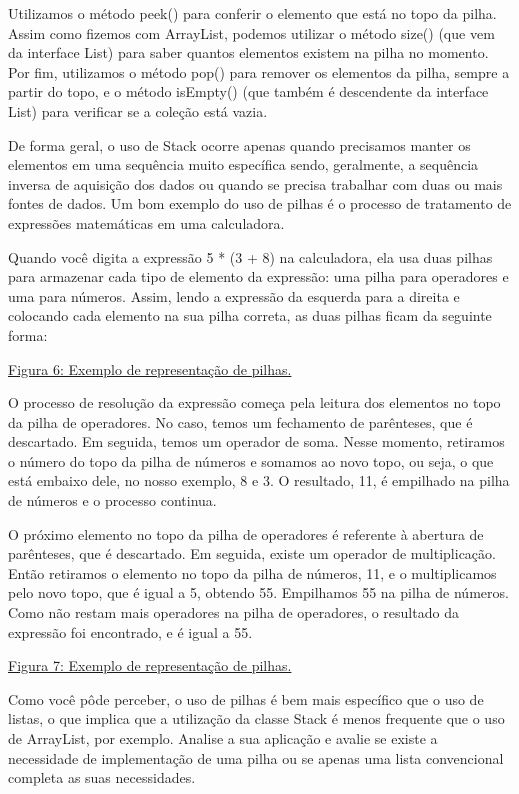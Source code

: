 \documentclass[11pt]{article}
\begin{document}
Utilizamos o método peek() para conferir o elemento que está no topo da pilha. Assim como fizemos com ArrayList, podemos utilizar o método size() (que vem da interface List) para saber quantos elementos existem na pilha no momento. Por fim, utilizamos o método pop() para remover os elementos da pilha, sempre a partir do topo, e o método isEmpty() (que também é descendente da interface List) para verificar se a coleção está vazia.

De forma geral, o uso de Stack ocorre apenas quando precisamos manter os elementos em uma sequência muito específica sendo, geralmente, a sequência inversa de aquisição dos dados ou quando se precisa trabalhar com duas ou mais fontes de dados. Um bom exemplo do uso de pilhas é o processo de tratamento de expressões matemáticas em uma calculadora.

Quando você digita a expressão 5 * (3 + 8) na calculadora, ela usa duas pilhas para armazenar cada tipo de elemento da expressão: uma pilha para operadores e uma para números. Assim, lendo a expressão da esquerda para a direita e colocando cada elemento na sua pilha correta, as duas pilhas ficam da seguinte forma:

\href{figura6.png}{Figura 6: Exemplo de representação de pilhas.}

O processo de resolução da expressão começa pela leitura dos elementos no topo da pilha de operadores. No caso, temos um fechamento de parênteses, que é descartado. Em seguida, temos um operador de soma. Nesse momento, retiramos o número do topo da pilha de números e somamos ao novo topo, ou seja, o que está embaixo dele, no nosso exemplo, 8 e 3. O resultado, 11, é empilhado na pilha de números e o processo continua.

O próximo elemento no topo da pilha de operadores é referente à abertura de parênteses, que é descartado. Em seguida, existe um operador de multiplicação. Então retiramos o elemento no topo da pilha de números, 11, e o multiplicamos pelo novo topo, que é igual a 5, obtendo 55. Empilhamos 55 na pilha de números. Como não restam mais operadores na pilha de operadores, o resultado da expressão foi encontrado, e é igual a 55.

\href{figura7.png}{Figura 7: Exemplo de representação de pilhas.}

Como você pôde perceber, o uso de pilhas é bem mais específico que o uso de listas, o que implica que a utilização da classe Stack é menos frequente que o uso de ArrayList, por exemplo. Analise a sua aplicação e avalie se existe a necessidade de implementação de uma pilha ou se apenas uma lista convencional completa as suas necessidades.
\end{document}
